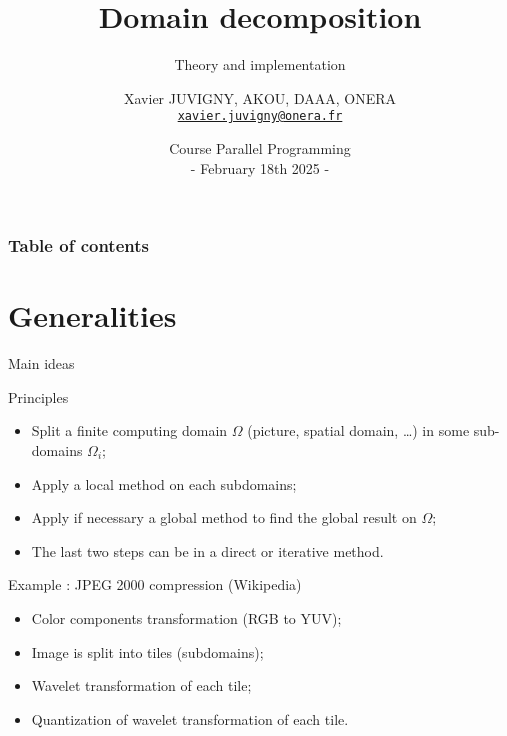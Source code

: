 \documentclass[compress,10pt,aspectratio=169]{beamer}
\title[Parallel programming\hspace{2em}]{Domain decomposition}
\subtitle{Theory and implementation}
\author[X. JUVIGNY]{Xavier JUVIGNY, AKOU, DAAA, ONERA\\ \href{mailto:xavier.juvigny@onera.fr}{\texttt{xavier.juvigny@onera.fr}} }
\date[18/02/2025]{Course Parallel Programming\\- February 18th 2025 -}
\institute{\inst{1}ONERA,\inst{2}DAAA}
\begin{document}
\MakeTitlePage

\begin{frame}
\frametitle{Table of contents}
\begin{multicols}{2}
\tableofcontents[hideallsubsections]
\end{multicols}
\end{frame}

\section{Generalities}

\begin{frame}[fragile]{Main ideas}
    \scriptsize

    \begin{block}{\small Principles}
        \begin{itemize}
            \item Split a finite computing domain $\Omega$ (picture, spatial domain, \dots) in some sub-domains $\Omega_{i}$;
            \item Apply a local method on each subdomains;
            \item Apply if necessary a global method to find the global result on $\Omega$;
            \item The last two steps can be in a direct or iterative method.
        \end{itemize}
    \end{block}

    \begin{exampleblock}{\small Example : JPEG 2000 compression (Wikipedia)}
        \begin{itemize}
            \item Color components transformation (RGB to YUV);
            \item Image is split into tiles (subdomains);
            \item Wavelet transformation of each tile;
            \item Quantization of wavelet transformation of each tile.
        \end{itemize}
    \end{exampleblock}
\end{frame}
\end{document}
